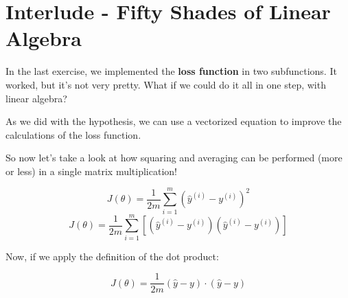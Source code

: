 
\section*{Interlude - Fifty Shades of Linear Algebra}

In the last exercise, we implemented the \textbf{loss function} in two subfunctions.
It worked, but it's not very pretty.
What if we could do it all in one step, with linear algebra?   

As we did with the hypothesis, we can use a vectorized equation to improve the calculations of the loss function.

So now let's take a look at how squaring and averaging can be performed (more or less) in a single matrix multiplication!

$$
J(\theta) = \frac{1}{2m}\sum_{i=1}^{m}(\hat{y}^{(i)} - y^{(i)})^2
$$
$$
J(\theta) = \frac{1}{2m}\sum_{i=1}^{m}[(\hat{y}^{(i)} - y^{(i)}) (\hat{y}^{(i)} - y^{(i)})]
$$

Now, if we apply the definition of the dot product:

$$
J(\theta) = \frac{1}{2m}(\hat{y} - y) \cdot(\hat{y}- y)
$$
